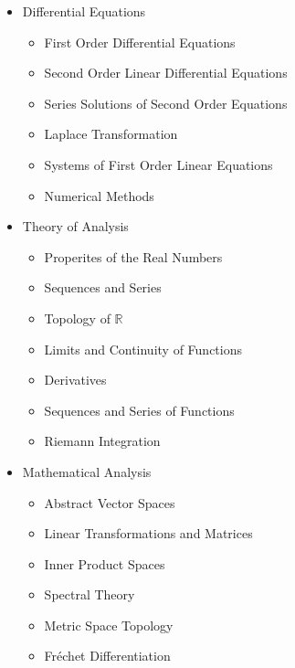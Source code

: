 \documentclass{article}
\begin{document}
\begin{addmargin}{2ex}
\begin{itemize}[labelindent=2ex, parsep=0ex, partopsep=0ex, topsep=-.7ex]
\begin{multicols}{3}
\begin{itemize}
          \item Vector Calculus
        \end{itemize}
      \end{multicols}
    \item Differential Equations
      \begin{multicols}{2}
        \begin{itemize}
          \item First Order Differential Equations
          \item Second Order Linear Differential Equations
          \item Series Solutions of Second Order Equations
          \item Laplace Transformation
          \item Systems of First Order Linear Equations
          \item Numerical Methods
        \end{itemize}
      \end{multicols}
    \item Theory of Analysis
      \begin{multicols}{2}
        \begin{itemize}
          \item Properites of the Real Numbers
          \item Sequences and Series
          \item Topology of $\mathbb{R}$
          \item Limits and Continuity of Functions
          \item Derivatives
          \item Sequences and Series of Functions
          \item Riemann Integration
        \end{itemize}
      \end{multicols}
    \item Mathematical Analysis
      \begin{multicols}{2}
        \begin{itemize}
          \item Abstract Vector Spaces
          \item Linear Transformations and Matrices
          \item Inner Product Spaces
          \item Spectral Theory
          \item Metric Space Topology
          \item Fr\'echet Differentiation

\end{itemize}
\end{multicols}
\end{itemize}
\end{addmargin}
\end{document}
